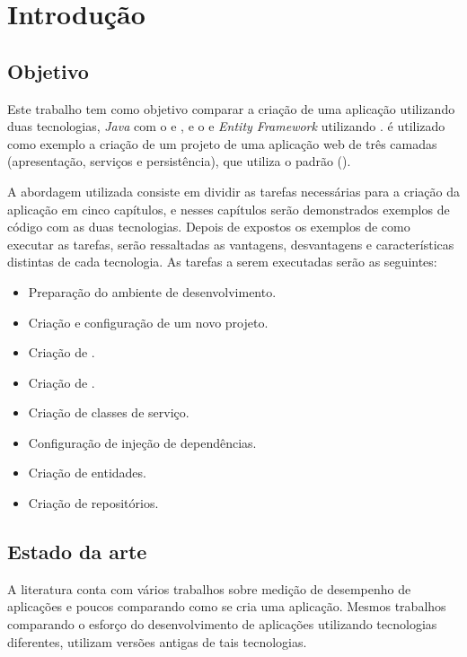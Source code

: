 \chapter{Introdução}
\label{cap:introducao}

\section{Objetivo}
\label{sec:objetivo}

Este trabalho tem como objetivo comparar a criação de uma aplicação utilizando duas tecnologias, \textit{Java} com o  e , e o  e \textit{Entity Framework} utilizando . é utilizado como exemplo a criação de um projeto de uma aplicação web de três camadas (apresentação, serviços e persistência), que utiliza o padrão  ().

A abordagem utilizada consiste em dividir as tarefas necessárias para a criação da aplicação em cinco capítulos, e nesses capítulos serão demonstrados exemplos de código com as duas tecnologias. Depois de expostos os exemplos de como executar as tarefas, serão ressaltadas as vantagens, desvantagens e características distintas de cada tecnologia. As tarefas a serem executadas serão as seguintes:

\begin{itemize}
  \item Preparação do ambiente de desenvolvimento.
  \item Criação e configuração de um novo projeto.
  \item Criação de .
  \item Criação de .
  \item Criação de classes de serviço.
  \item Configuração de injeção de dependências.
  \item Criação de entidades.
  \item Criação de repositórios.
\end{itemize}

\section{Estado da arte}
\label{sec:estadoarte}
 
A literatura conta com vários trabalhos sobre medição de desempenho de aplicações  e poucos comparando como se cria uma aplicação. Mesmos trabalhos comparando o esforço do desenvolvimento de aplicações utilizando tecnologias diferentes, utilizam versões antigas de tais tecnologias. 

